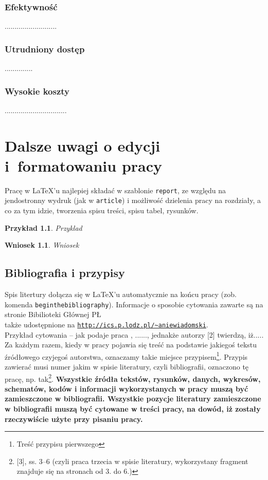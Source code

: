 \documentclass[12pt]{report}
\newtheorem{example}{Przykład}[chapter]
\newtheorem{corollary}{Wniosek}[chapter]
\begin{document}
\subsection{Efektywność}
..........................
\subsection{Utrudniony dostęp}
..............
\subsection{Wysokie koszty}
...............................

\chapter{Dalsze uwagi o edycji i~formatowaniu pracy}
Pracę w \LaTeX'u najlepiej składać w szablonie {\tt report}, ze względu na jendostronny wydruk (jak w {\tt article}) i możliwość dzielenia pracy na rozdziały, a co za tym idzie, tworzenia spisu treści, spisu tabel, rysunków. 
\begin{example}
Przyklad
\end{example}

\begin{corollary}
Wniosek
\end{corollary}
\section{Bibliografia i przypisy}
Spis litertury dołącza się  w \LaTeX'u automatycznie na końcu pracy (zob.
komenda {\tt begin{thebibliography}}). Informacje o sposobie cytowania zawarte
są na stronie Bibilioteki Głównej PŁ\\ także udostępnione na
\underline{\tt http://ics.p.lodz.pl/\textasciitilde aniewiadomski}. \\

\indent Przykład cytowania --  jak podaje praca \cite{kacprzyk86}, ......,
jednakże autorzy [2] twierdzą, iż.....\\


\indent Za każdym razem, kiedy w pracy pojawia się treść na podstawie jakiegoś
tekstu źródłowego czyjegoś autorstwa, oznaczamy takie miejsce
przypisem\footnote{Treść przypisu pierwszego}. Przypis zawierać musi  numer
jakim w spisie literatury, czyli bibliografii, oznaczono tę pracę, np.
tak\footnote{[3], ss. 3--6 (czyli praca trzecia w spisie literatury,
wykorzystany fragment znajduje się na stronach od 3. do 6.)}. {\bf
Wszystkie źródła tekstów, rysunków, danych, wykresów, schematów, kodów i
informacji wykorzystanych w pracy muszą być zamieszczone w bibliografii.
Wszystkie pozycje literatury zamieszczone w bibliografii muszą być cytowane w
treści pracy, na dowód, iż zostały rzeczywiście użyte przy pisaniu pracy.}
\end{document}

